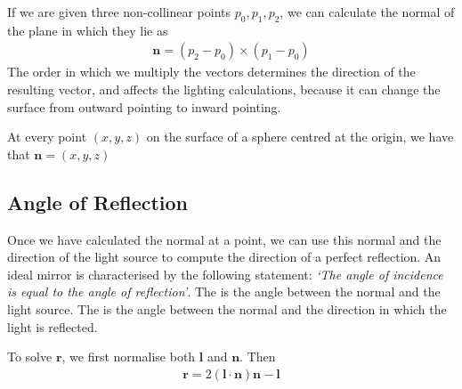 \documentclass[../COS3712_Notes.tex]{subfiles}
\begin{document}
        If we are given three non-collinear points $p_0, p_1, p_2$, we can calculate the normal
        of the plane in which they lie as
        \begin{align*}
          \mathbf{n} = (p_2 - p_0) \times (p_1 - p_0)
        \end{align*}
        The order in which we multiply the vectors determines the direction of the resulting
        vector, and affects the lighting calculations, because it can change the surface
        from outward pointing to inward pointing.

        At every point $(x, y, z)$ on the surface of a sphere centred at the origin,
        we have that $\mathbf{n} = (x, y, z)$

      \subsection{Angle of Reflection}
        Once we have calculated the normal at a point, we can use this normal and the direction
        of the light source to compute the direction of a perfect reflection.
        An ideal mirror is characterised by the following statement:
        \emph{`The angle of incidence is equal to the angle of reflection'}.
        The  is the angle between the normal and the light source.
        The  is the angle between the normal and the direction
        in which the light is reflected.

        To solve $\mathbf{r}$, we first normalise both $\mathbf{l}$ and $\mathbf{n}$.
        Then
        \begin{align*}
          \mathbf{r} = 2 (\mathbf{l} \cdot \mathbf{n}) \mathbf{n} - \mathbf{l}
        \end{align*}
\end{document}

